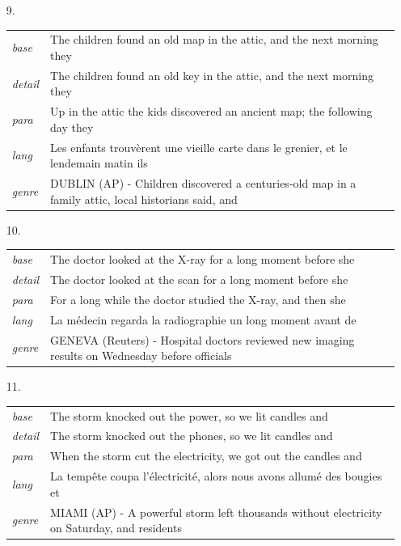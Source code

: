 \documentclass[11pt]{article}
\theoremstyle{definition}
\theoremstyle{remark}
\begin{document}
{\begin{itemize}
\item[9.] \begin{tabular}[t]{@{}ll@{}}\emph{base} & \parbox[t]{0.78\linewidth}{The children found an old map in the attic, and the next morning they}\\\emph{detail} & \parbox[t]{0.78\linewidth}{The children found an old key in the attic, and the next morning they}\\\emph{para} & \parbox[t]{0.78\linewidth}{Up in the attic the kids discovered an ancient map; the following day they}\\\emph{lang} & \parbox[t]{0.78\linewidth}{Les enfants trouvèrent une vieille carte dans le grenier, et le lendemain matin ils}\\\emph{genre} & \parbox[t]{0.78\linewidth}{DUBLIN (AP) - Children discovered a centuries-old map in a family attic, local historians said, and}\\\end{tabular}
\item[10.] \begin{tabular}[t]{@{}ll@{}}\emph{base} & \parbox[t]{0.78\linewidth}{The doctor looked at the X-ray for a long moment before she}\\\emph{detail} & \parbox[t]{0.78\linewidth}{The doctor looked at the scan for a long moment before she}\\\emph{para} & \parbox[t]{0.78\linewidth}{For a long while the doctor studied the X-ray, and then she}\\\emph{lang} & \parbox[t]{0.78\linewidth}{La médecin regarda la radiographie un long moment avant de}\\\emph{genre} & \parbox[t]{0.78\linewidth}{GENEVA (Reuters) - Hospital doctors reviewed new imaging results on Wednesday before officials}\\\end{tabular}
\item[11.] \begin{tabular}[t]{@{}ll@{}}\emph{base} & \parbox[t]{0.78\linewidth}{The storm knocked out the power, so we lit candles and}\\\emph{detail} & \parbox[t]{0.78\linewidth}{The storm knocked out the phones, so we lit candles and}\\\emph{para} & \parbox[t]{0.78\linewidth}{When the storm cut the electricity, we got out the candles and}\\\emph{lang} & \parbox[t]{0.78\linewidth}{La tempête coupa l'électricité, alors nous avons allumé des bougies et}\\\emph{genre} & \parbox[t]{0.78\linewidth}{MIAMI (AP) - A powerful storm left thousands without electricity on Saturday, and residents}\\\end{tabular}

\end{itemize}}
\end{document}
